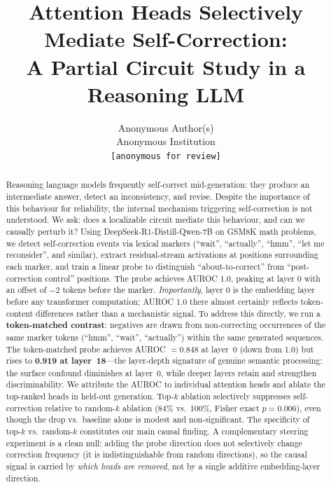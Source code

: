 \documentclass{article}
\title{Attention Heads Selectively Mediate Self-Correction:\\
A Partial Circuit Study in a Reasoning LLM}
\author{Anonymous Author(s) \\ Anonymous Institution \\ \texttt{[anonymous for review]}}
\begin{document}
\maketitle

\begin{abstract}
Reasoning language models frequently self-correct mid-generation: they produce an intermediate answer, detect an inconsistency, and revise.
Despite the importance of this behaviour for reliability, the internal mechanism triggering self-correction is not understood.
We ask: does a localizable circuit mediate this behaviour, and can we causally perturb it?
Using DeepSeek-R1-Distill-Qwen-7B on GSM8K math problems, we detect self-correction events via lexical markers (``wait'', ``actually'', ``hmm'', ``let me reconsider'', and similar), extract residual-stream activations at positions surrounding each marker, and train a linear probe to distinguish ``about-to-correct'' from ``post-correction control'' positions.
The probe achieves AUROC 1.0, peaking at layer 0 with an offset of $-2$ tokens before the marker.
\emph{Importantly}, layer 0 is the embedding layer before any transformer computation; AUROC 1.0 there almost certainly reflects token-content differences rather than a mechanistic signal.
To address this directly, we run a \textbf{token-matched contrast}: negatives are drawn from non-correcting occurrences of the same marker tokens (``hmm'', ``wait'', ``actually'') within the same generated sequences.
The token-matched probe achieves AUROC $= 0.848$ at layer~0 (down from 1.0) but rises to \textbf{0.919 at layer~18}---the layer-depth signature of genuine semantic processing: the surface confound diminishes at layer~0, while deeper layers retain and strengthen discriminability.
We attribute the AUROC to individual attention heads and ablate the top-ranked heads in held-out generation.
Top-$k$ ablation selectively suppresses self-correction relative to random-$k$ ablation (84\% vs.\ 100\%, Fisher exact $p = 0.006$), even though the drop vs.\ baseline alone is modest and non-significant.
The specificity of top-$k$ vs.\ random-$k$ constitutes our main causal finding.
A complementary steering experiment is a clean null: adding the probe direction does not selectively change correction frequency (it is indistinguishable from random directions), so the causal signal is carried by \emph{which heads are removed}, not by a single additive embedding-layer direction.
\end{abstract}

\end{document}
